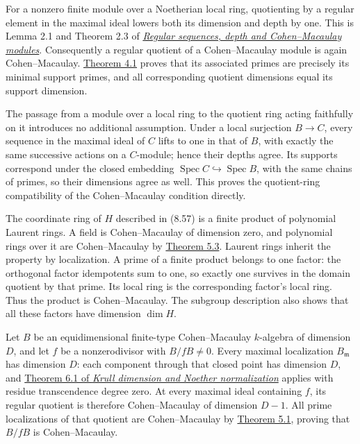 \documentclass[
  11pt,
  a4paper,
]{article}
\begin{document}
For a nonzero finite module over a Noetherian local ring, quotienting by
a regular element in the maximal ideal lowers both its dimension and
depth by one. This is Lemma 2.1 and Theorem 2.3 of
\href{https://kokunoyumeto.github.io/open-math-courses-public/courses/AG-CA/regular-sequences-depth-and-cohen-macaulay-modules.html\#2-depth-and-its-homological-measurement}{\emph{Regular
sequences, depth and Cohen--Macaulay modules}}. Consequently a regular
quotient of a Cohen--Macaulay module is again Cohen--Macaulay.
\href{https://kokunoyumeto.github.io/open-math-courses-public/courses/AG-CA/regular-sequences-depth-and-cohen-macaulay-modules.html\#4-when-dimension-detects-regularity}{Theorem
4.1} proves that its associated primes are precisely its minimal support
primes, and all corresponding quotient dimensions equal its support
dimension.

The passage from a module over a local ring to the quotient ring acting
faithfully on it introduces no additional assumption. Under a local
surjection \(B\to C\), every sequence in the maximal ideal of \(C\)
lifts to one in that of \(B\), with exactly the same successive actions
on a \(C\)-module; hence their depths agree. Its supports correspond
under the closed embedding
\(\operatorname{Spec}C\hookrightarrow\operatorname{Spec}B\), with the
same chains of primes, so their dimensions agree as well. This proves
the quotient-ring compatibility of the Cohen--Macaulay condition
directly.

The coordinate ring of \(H\) described in (8.57) is a finite product of
polynomial Laurent rings. A field is Cohen--Macaulay of dimension zero,
and polynomial rings over it are Cohen--Macaulay by
\href{https://kokunoyumeto.github.io/open-math-courses-public/courses/AG-CA/regular-sequences-depth-and-cohen-macaulay-modules.html\#5-localization-and-cohen-macaulay-rings}{Theorem
5.3}. Laurent rings inherit the property by localization. A prime of a
finite product belongs to one factor: the orthogonal factor idempotents
sum to one, so exactly one survives in the domain quotient by that
prime. Its local ring is the corresponding factor's local ring. Thus the
product is Cohen--Macaulay. The subgroup description also shows that all
these factors have dimension \(\dim H\).

Let \(B\) be an equidimensional finite-type Cohen--Macaulay
\(k\)-algebra of dimension \(D\), and let \(f\) be a nonzerodivisor with
\(B/fB\ne0\). Every maximal localization \(B_{\mathfrak m}\) has
dimension \(D\): each component through that closed point has dimension
\(D\), and
\href{https://kokunoyumeto.github.io/open-math-courses-public/courses/AG-CA/krull-dimension-and-noether-normalization.html\#6-dimension-at-a-point}{Theorem
6.1 of \emph{Krull dimension and Noether normalization}} applies with
residue transcendence degree zero. At every maximal ideal containing
\(f\), its regular quotient is therefore Cohen--Macaulay of dimension
\(D-1\). All prime localizations of that quotient are Cohen--Macaulay by
\href{https://kokunoyumeto.github.io/open-math-courses-public/courses/AG-CA/regular-sequences-depth-and-cohen-macaulay-modules.html\#5-localization-and-cohen-macaulay-rings}{Theorem
5.1}, proving that \(B/fB\) is Cohen--Macaulay.
\end{document}
